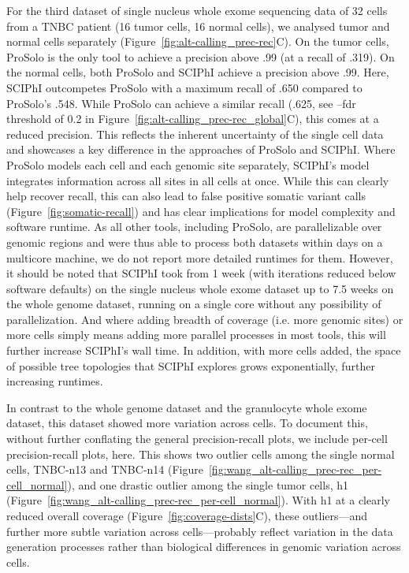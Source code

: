 \documentclass[authoryear,preprint,11pt]{scrartcl}
\begin{document}
For the third dataset of single nucleus whole exome sequencing data of 32 cells from a TNBC patient (16 tumor cells, 16 normal cells), we analysed tumor and normal cells separately (Figure~\ref{fig:alt-calling_prec-rec}C).
On the tumor cells, ProSolo is the only tool to achieve a precision above .99 (at a recall of .319).
On the normal cells, both ProSolo and SCIPhI achieve a precision above .99.
Here, SCIPhI outcompetes ProSolo with a maximum recall of .650 compared to ProSolo's .548.
While ProSolo can achieve a similar recall (.625, see {\ttfamily --fdr} threshold of 0.2 in Figure~\ref{fig:alt-calling_prec-rec_global}C), this comes at a reduced precision.
This reflects the inherent uncertainty of the single cell data and showcases a key difference in the approaches of ProSolo and SCIPhI.
Where ProSolo models each cell and each genomic site separately, SCIPhI's model integrates information across all sites in all cells at once.
While this can clearly help recover recall, this can also lead to false positive somatic variant calls (Figure~\ref{fig:somatic-recall}) and has clear implications for model complexity and software runtime.
As all other tools, including ProSolo, are parallelizable over genomic regions and were thus able to process both datasets within days on a multicore machine, we do not report more detailed runtimes for them.
However, it should be noted that SCIPhI took from 1 week (with iterations reduced below software defaults) on the single nucleus whole exome dataset up to 7.5 weeks on the whole genome dataset, running on a single core without any possibility of parallelization.
And where adding breadth of coverage (i.e. more genomic sites) or more cells simply means adding more parallel processes in most tools, this will further increase SCIPhI's wall time.
In addition, with more cells added, the space of possible tree topologies that SCIPhI explores grows exponentially, further increasing runtimes.

In contrast to the whole genome dataset and the granulocyte whole exome dataset, this dataset showed more variation across cells.
To document this, without further conflating the general precision-recall plots, we include per-cell precision-recall plots, here.
This shows two outlier cells among the single normal cells, TNBC-n13 and TNBC-n14 (Figure~\ref{fig:wang_alt-calling_prec-rec_per-cell_normal}), and one drastic outlier among the single tumor cells, h1 (Figure~\ref{fig:wang_alt-calling_prec-rec_per-cell_normal}).
With h1 at a clearly reduced overall coverage (Figure~\ref{fig:coverage-dists}C), these outliers---and further more subtle variation across cells---probably reflect variation in the data generation processes rather than biological differences in genomic variation across cells.
\end{document}

